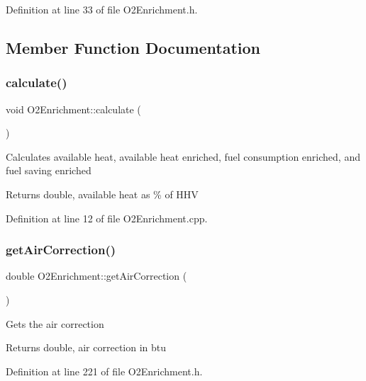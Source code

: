 Definition at line 33 of file O2\+Enrichment.\+h.



\subsection{Member Function Documentation}
\mbox{\label{class_o2_enrichment_a91d7e18a336466cf9fbc0cae42dde282}} 
\subsubsection{\texorpdfstring{calculate()}{calculate()}}
{\footnotesize\ttfamily void O2\+Enrichment\+::calculate (\begin{DoxyParamCaption}{ }\end{DoxyParamCaption})}

Calculates available heat, available heat enriched, fuel consumption enriched, and fuel saving enriched \begin{DoxyReturn}{Returns}
double, available heat as \% of H\+HV 
\end{DoxyReturn}


Definition at line 12 of file O2\+Enrichment.\+cpp.

\mbox{\label{class_o2_enrichment_a95f854d807f2b33ca32c68707e627283}} 
\subsubsection{\texorpdfstring{get\+Air\+Correction()}{getAirCorrection()}}
{\footnotesize\ttfamily double O2\+Enrichment\+::get\+Air\+Correction (\begin{DoxyParamCaption}{ }\end{DoxyParamCaption})\hspace{0.3cm}{\ttfamily [inline]}}

Gets the air correction \begin{DoxyReturn}{Returns}
double, air correction in btu 
\end{DoxyReturn}


Definition at line 221 of file O2\+Enrichment.\+h.

